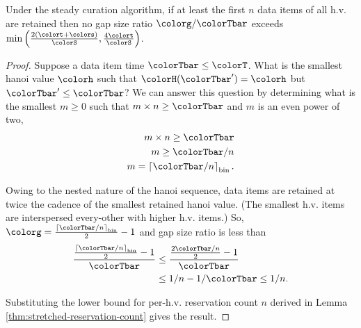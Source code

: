 \begin{theorem}
\label{thm:stretched-gap-size}
Under the steady curation algorithm, if at least the first $n$ data items of all h.v. are retained then no gap size ratio $\colorg/\colorTbar$ exceeds $\min\Big(
  \frac{2(\colort + \colors)}{\colorS},
  \frac{4\colort}{\colorS}
\Big)$.
\end{theorem}
\begin{proof}

Suppose a data item time $\colorTbar \leq \colorT$.
What is the smallest hanoi value $\colorh$ such that $\colorH(\colorTbar') = \colorh$ but $\colorTbar' \leq \colorTbar$?
We can answer this question by determining what is the smallest $m \geq 0$ such that $m \times n \geq \colorTbar$ and $m$ is an even power of two,
\begin{align*}
m \times n \geq \colorTbar\\
m \geq \colorTbar / n\\
m = \left\lceil \colorTbar / n \right\rceil_{\mathrm{bin}}.
\end{align*}

Owing to the nested nature of the hanoi sequence, data items are retained at twice the cadence of the smallest retained hanoi value.
(The smallest h.v. items are interspersed every-other with higher h.v. items.)
So, $\colorg = \frac{\left\lceil \colorTbar / n \right\rceil_{\mathrm{bin}}}{2} - 1$ and gap size ratio is less than
\begin{align*}
\frac{
\frac{\left\lceil \colorTbar / n \right\rceil_{\mathrm{bin}}}{2} - 1
}{
\colorTbar
}
&\leq
\frac{
\frac{2\colorTbar / n}{2} - 1
}{
\colorTbar
}\\
&\leq
1 / n - 1 / \colorTbar
\leq
1 / n.
\end{align*}

Substituting the lower bound for per-h.v. reservation count $n$ derived in Lemma \ref{thm:stretched-reservation-count} gives the result.
\end{proof}
